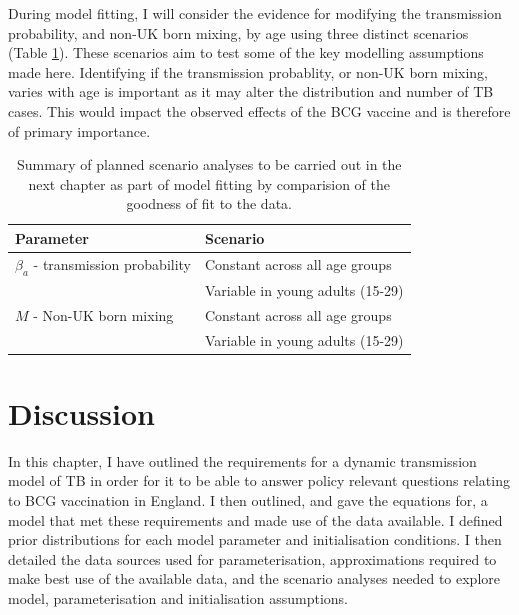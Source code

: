 \documentclass[11pt,twoside]{bristolthesis}
\begin{document}
  During model fitting, I will consider the evidence for modifying the transmission probability, and non-UK born mixing, by age using three distinct scenarios (Table \ref{tab:summary-scenarios}). These scenarios aim to test some of the key modelling assumptions made here. Identifying if the transmission probablity, or non-UK born mixing, varies with age is important as it may alter the distribution and number of TB cases. This would impact the observed effects of the BCG vaccine and is therefore of primary importance.
  \begin{table}[t]
  
  \caption{\label{tab:summary-scenarios}Summary of planned scenario analyses to be carried out in the next chapter as part of model fitting by comparision of the goodness of fit to the data.}
  \centering
  \begin{tabular}{>{\raggedright\arraybackslash}p{4cm}>{\raggedright\arraybackslash}p{8cm}}
  \toprule
  Parameter & Scenario\\
  \midrule
  $\beta_a$ - transmission probability & Constant across all age groups\\
   & Variable in young adults (15-29)\\
  $M$ - Non-UK born mixing & Constant across all age groups\\
   & Variable in young adults (15-29)\\
  \bottomrule
  \end{tabular}
  \end{table}
  \hypertarget{discussion-5}{%
  \section{Discussion}\label{discussion-5}}
  
  In this chapter, I have outlined the requirements for a dynamic transmission model of TB in order for it to be able to answer policy relevant questions relating to BCG vaccination in England. I then outlined, and gave the equations for, a model that met these requirements and made use of the data available. I defined prior distributions for each model parameter and initialisation conditions. I then detailed the data sources used for parameterisation, approximations required to make best use of the available data, and the scenario analyses needed to explore model, parameterisation and initialisation assumptions.
  
\end{document}
